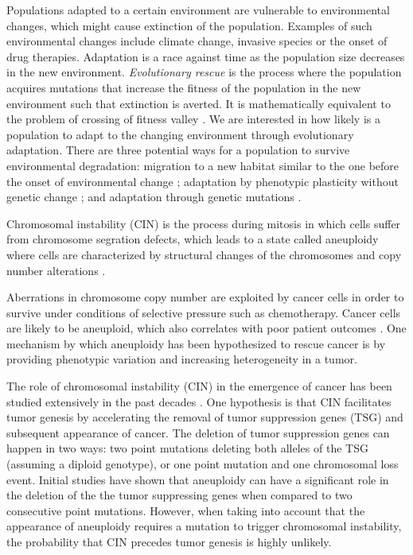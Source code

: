 \documentclass[11pt,a4paper]{article}
\begin{document}
Populations adapted to a certain environment are vulnerable to environmental changes, which might cause extinction of the population. Examples of such environmental changes include climate change, invasive species or the onset of drug therapies. Adaptation is a race against time as the population size decreases in the new environment\cite{tanaka2022surviving}. 
{\em Evolutionary rescue} is the process where the population acquires mutations that increase the fitness of the population in the new environment such that extinction is averted. It is mathematically equivalent to the problem of crossing of fitness valley \cite{weissman2009rate,weissman2010rate}.
We are interested in how likely is a population to adapt to the changing environment through evolutionary adaptation.
There are three potential ways for a population to survive environmental degradation: migration to a new habitat similar to the one before the onset of environmental change \cite{cobbold2020should}; adaptation by phenotypic plasticity without genetic change \cite{carja2019evolutionary,carja2017evolutionary,levien2021non}; and adaptation through genetic mutations \cite{uecker2014evolutionary,uecker2016role,uecker2011fixation}.

Chromosomal instability (CIN) is the process during mitosis in which cells suffer from chromosome segration defects, which leads to a state called aneuploidy where cells are characterized by structural changes of the chromosomes and copy number alterations \cite{schukken2018cin}.

Aberrations in chromosome copy number are exploited by cancer cells in order to survive under conditions of selective pressure such as chemotherapy. %
Cancer cells are likely to be aneuploid, which also correlates with poor patient outcomes \cite{ben2020context}. One mechanism by which aneuploidy has been hypothesized to rescue cancer is by providing phenotypic variation and increasing heterogeneity in a tumor. 

The role of chromosomal instability (CIN) in the emergence of cancer has been studied extensively in the past decades \cite{michor2005can,christine2018understanding,nowak2002role,pavelka2010dr,komarova2003mutation,zhu2018cellular}.
One hypothesis is that CIN facilitates tumor genesis by accelerating the removal of tumor suppression genes (TSG) and subsequent appearance of cancer. The deletion of tumor suppression genes can happen in two ways: two point mutations deleting both alleles of the TSG (assuming a diploid genotype), or one point mutation and one chromosomal loss event. Initial studies have shown that aneuploidy can have a significant role in the deletion of the the tumor suppressing genes when compared to two consecutive point mutations\cite{nowak2002role,komarova2003mutation,michor2005can,komarova2008selective}. %
However, when taking into account that the appearance of aneuploidy requires a mutation to trigger chromosomal instability, the probability that CIN precedes tumor genesis is highly unlikely.
\end{document}
